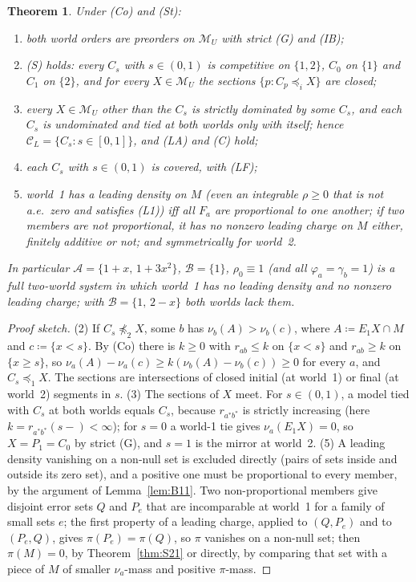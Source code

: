 \documentclass[11pt]{article}
\newtheorem{theorem}{Theorem}[section]
\theoremstyle{definition}
\theoremstyle{remark}
\newcommand{\M}{\mathcal M}
\newcommand{\C}{\mathcal C}
\begin{document}
\begin{theorem}\label{thm:C21}
Under (Co) and (St):
\begin{enumerate}[leftmargin=*,label=(\arabic*)]
\item both world orders are preorders on $\M_U$ with strict (G) and (IB);
\item (S) holds: every $C_s$ with $s\in(0,1)$ is competitive on $\{1,2\}$, $C_0$ on $\{1\}$ and $C_1$ on $\{2\}$, and for every $X\in\M_U$ the sections $\{p:C_p\preceq_iX\}$ are closed;
\item every $X\in\M_U$ other than the $C_s$ is strictly dominated by some $C_s$, and each $C_s$ is undominated and tied at both worlds only with itself; hence $\C_L=\{C_s:s\in[0,1]\}$, and (LA) and (C) hold;
\item each $C_s$ with $s\in(0,1)$ is covered, with (LF);
\item world~1 has a leading density on $M$ (even an integrable $\rho\ge0$ that is not a.e.\ zero and satisfies (L1)) iff all $F_a$ are proportional to one another; if two members are not proportional, it has no nonzero leading charge on $M$ either, finitely additive or not; and symmetrically for world~2.
\end{enumerate}
In particular $\mathcal A=\{1+x,\,1+3x^2\}$, $\mathcal B=\{1\}$, $\rho_0\equiv1$ (and all $\varphi_a=\gamma_b=1$) is a full two-world system in which world~1 has no leading density and no nonzero leading charge; with $\mathcal B=\{1,\,2-x\}$ both worlds lack them.
\end{theorem}
\begin{proof}[Proof sketch]
(2) If $C_s\not\preceq_2X$, some $b$ has $\nu_b(A)>\nu_b(c)$, where $A\coloneqq E_1X\cap M$ and $c\coloneqq\{x<s\}$. By (Co) there is $k\ge0$ with $r_{ab}\le k$ on $\{x<s\}$ and $r_{ab}\ge k$ on $\{x\ge s\}$, so $\nu_a(A)-\nu_a(c)\ge k(\nu_b(A)-\nu_b(c))\ge0$ for every $a$, and $C_s\preceq_1X$. The sections are intersections of closed initial (at world~1) or final (at world~2) segments in $s$. (3) The sections of $X$ meet. For $s\in(0,1)$, a model tied with $C_s$ at both worlds equals $C_s$, because $r_{a^*b^*}$ is strictly increasing (here $k=r_{a^*b^*}(s-)<\infty$); for $s=0$ a world-1 tie gives $\nu_a(E_1X)=0$, so $X=P_1=C_0$ by strict (G), and $s=1$ is the mirror at world~2. (5) A leading density vanishing on a non-null set is excluded directly (pairs of sets inside and outside its zero set), and a positive one must be proportional to every member, by the argument of Lemma~\ref{lem:B11}. Two non-proportional members give disjoint error sets $Q$ and $P_e$ that are incomparable at world~1 for a family of small sets $e$; the first property of a leading charge, applied to $(Q,P_e)$ and to $(P_e,Q)$, gives $\pi(P_e)=\pi(Q)$, so $\pi$ vanishes on a non-null set; then $\pi(M)=0$, by Theorem~\ref{thm:S21} or directly, by comparing that set with a piece of $M$ of smaller $\nu_a$-mass and positive $\pi$-mass.
\end{proof}
\end{document}
